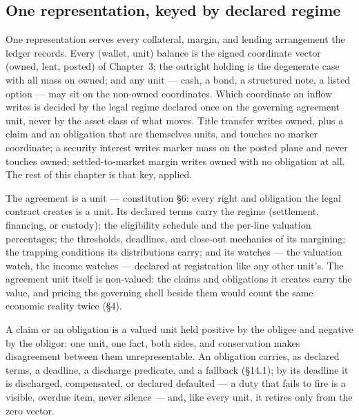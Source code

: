\documentclass[11pt,a4paper]{article}
\begin{document}
\subsection{One representation, keyed by declared regime}

One representation serves every collateral, margin, and lending arrangement the
ledger records. Every (wallet, unit) balance is the signed coordinate vector
(owned, lent, posted) of Chapter~3; the outright holding is the degenerate case
with all mass on owned; and any unit --- cash, a bond, a structured note, a
listed option --- may sit on the non-owned coordinates. Which coordinate an
inflow writes is decided by the legal regime declared once on the governing
agreement unit, never by the asset class of what moves. Title transfer writes
owned, plus a claim and an obligation that are themselves units, and touches no
marker coordinate; a security interest writes marker mass on the posted plane
and never touches owned; settled-to-market margin writes owned with no
obligation at all. The rest of this chapter is that key, applied.

The agreement is a unit --- constitution \S6: every right and obligation the
legal contract creates is a unit. Its declared terms carry the regime
(settlement, financing, or custody); the eligibility schedule and the per-line
valuation percentages; the thresholds, deadlines, and close-out mechanics of
its margining; the trapping conditions its distributions carry; and its
watches --- the valuation watch, the income watches --- declared at
registration like any other unit's. The agreement unit itself is non-valued:
the claims and obligations it creates carry the value, and pricing the
governing shell beside them would count the same economic reality twice
(\S4).

A claim or an obligation is a valued unit held positive by the obligee and
negative by the obligor: one unit, one fact, both sides, and conservation makes
disagreement between them unrepresentable. An obligation carries, as declared
terms, a deadline, a discharge predicate, and a fallback (\S14.1); by its
deadline it is discharged, compensated, or declared defaulted --- a duty that
fails to fire is a visible, overdue item, never silence --- and, like every
unit, it retires only from the zero vector.
\end{document}
